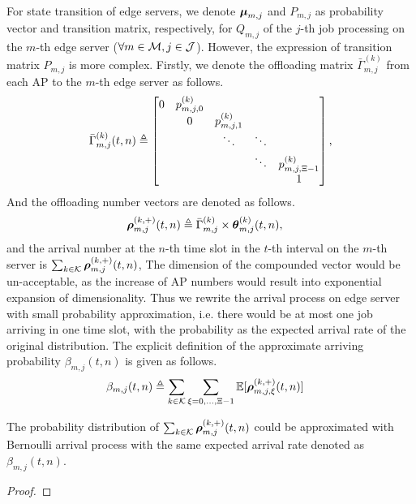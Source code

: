 For state transition of edge servers, we denote $\boldsymbol{\mu}_{m,j}$ and $P_{m,j}$ as probability vector and transition matrix, respectively, for $Q_{m,j}$ of the $j$-th job processing on the $m$-th edge server ($\forall m\in\mathcal{M}, j\in\mathcal{J}$).
However, the expression of transition matrix $P_{m,j}$ is more complex. Firstly, we denote the offloading matrix $\bar{\Gamma}^{(k)}_{m,j}$ from each AP to the $m$-th edge server as follows.
\begin{align}
    \bar{\Gamma}^{(k)}_{m,j}(t,n) \triangleq
    \begin{bmatrix}
        0 & p^{(k)}_{m,j,0} &                 &        &                     \\
        & 0               & p^{(k)}_{m,j,1} &        &                     \\
        &                 & \ddots          & \ddots &                     \\
        &                 &                 & \ddots & p^{(k)}_{m,j,\Xi-1} \\
        &                 &                 &        & 1                   \\
    \end{bmatrix},
\end{align}
And the offloading number vectors are denoted as follows.
\begin{align}
    \boldsymbol{\rho}^{(k,+)}_{m,j}({t,n}) &\triangleq \bar{\Gamma}^{(k)}_{m,j} \times \boldsymbol{\theta}^{(k)}_{m,j}({t,n}),
\end{align}
and the arrival number at the $n$-th time slot in the $t$-th interval on the $m$-th server is $\sum_{k\in\mathcal{K}} \boldsymbol{\rho}^{(k,+)}_{m,j}({t,n})$,
The dimension of the compounded vector would be un-acceptable, as the increase of AP numbers would result into exponential expansion of dimensionality.
Thus we rewrite the arrival process on edge server with small probability approximation, i.e. there would be at most one job arriving in one time slot, with the probability as the expected arrival rate of the original distribution. The explicit definition of the approximate arriving probability $\beta_{m,j}({t,n})$ is given as follows.
\begin{align}
    {\beta}_{m,j}({t,n}) &\triangleq \sum_{k\in\mathcal{K}} \sum_{\xi=0,\dots,\Xi-1} \mathbb{E}[\boldsymbol{\rho}^{(k,+)}_{m,j,\xi}({t,n})]
    \label{eqn_0}
\end{align}
\begin{lemma}
    The probability distribution of $\sum_{k\in\mathcal{K}} \boldsymbol{\rho}^{(k,+)}_{m,j}({t,n})$ could be approximated with Bernoulli arrival process with the same expected arrival rate denoted as ${\beta}_{m,j}({t,n})$.
\end{lemma}
\begin{proof}
\end{proof}

